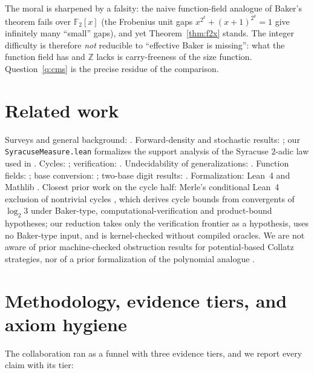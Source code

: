\documentclass[11pt]{amsart}
\theoremstyle{definition}
\theoremstyle{remark}
\newcommand{\lean}[1]{{\def\_{\textunderscore\allowbreak}\texttt{#1}}}
\newcommand{\F}{\mathbb{F}}
\newcommand{\Z}{\mathbb{Z}}
\begin{document}
The moral is sharpened by a falsity: the naive function-field analogue of
Baker's theorem fails over $\F_2[x]$ (the Frobenius unit gaps
$x^{2^k} + (x+1)^{2^k} = 1$ give infinitely many ``small'' gaps), and yet
Theorem~\ref{thm:f2x} stands.  The integer difficulty is therefore \emph{not}
reducible to ``effective Baker is missing'': what the function field has and
$\Z$ lacks is carry-freeness of the size function.  Question~\ref{q:cms} is
the precise residue of the comparison.

\section{Related work}\label{sec:related}

Surveys and general background: \cite{Lagarias1985,Lagarias2010,Wirsching1998}.
Forward-density and stochastic results: \cite{Terras1976,Everett1977,
KrasikovLagarias2003,Tao2019}; our \lean{SyracuseMeasure.lean} formalizes the
support analysis of the Syracuse $2$-adic law used in \cite{Tao2019}.
Cycles: \cite{Eliahou1993,SimonsDeWeger2005,Hercher2023}; verification:
\cite{OliveiraESilva2010,Barina2021}.  Undecidability of generalizations:
\cite{Conway1972,KurtzSimon2007}.  Function fields:
\cite{HMYZ2008,BehajainaParan2023,BehajainaParan2023b,AlonBehajainaParan2024};
base conversion: \cite{SterinWoods2020};
two-base digit results: \cite{SengeStraus1973,Stewart1980}.  Formalization:
Lean~4 \cite{Lean4} and Mathlib \cite{Mathlib2020}.  Closest prior work on
the cycle half: Merle's conditional Lean~4 exclusion of nontrivial cycles
\cite{Merle2026}, which derives cycle bounds from convergents of $\log_2 3$
under Baker-type, computational-verification and product-bound hypotheses;
our reduction takes only the verification frontier as a hypothesis, uses no
Baker-type input, and is kernel-checked without compiled oracles.  We are
not aware of prior machine-checked obstruction results for potential-based
Collatz strategies, nor of a prior formalization of the polynomial analogue
\cite{HMYZ2008,SnappTracy2008}.

\section{Methodology, evidence tiers, and axiom hygiene}\label{sec:methodology}

The collaboration ran as a funnel with three evidence tiers, and we report
every claim with its tier:
\end{document}

